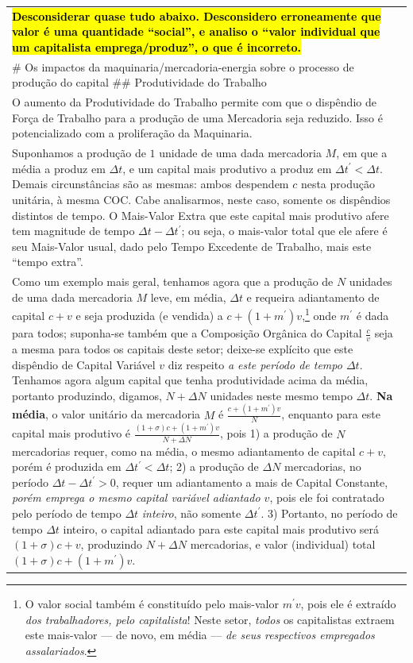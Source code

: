 \documentclass[12pt]{article}
\numberwithin{equation}{section}
\theoremstyle{plain}
\theoremstyle{definition}
\theoremstyle{remark}
\begin{document}
\begin{longtable}[]{@{}
  >{\raggedright\arraybackslash}p{}@{}}
\toprule\noalign{}
\endhead
\bottomrule\noalign{}
\endlastfoot
\hl{\textbf{Desconsiderar quase tudo abaixo. Desconsidero erroneamente que valor é uma quantidade ``social'', e analiso o ``valor individual que um capitalista emprega/produz'', o que é incorreto.}} \\
\# Os impactos da maquinaria/mercadoria-energia sobre o processo de produção do capital \#\# Produtividade do Trabalho \\
O aumento da Produtividade do Trabalho permite com que o dispêndio de Força de Trabalho para a produção de uma Mercadoria seja reduzido. Isso é potencializado com a proliferação da Maquinaria. \\
Suponhamos a produção de $1$ unidade de uma dada mercadoria $M$, em que a média a produz em $\Delta t$, e um capital mais produtivo a produz em $\Delta t^{\prime}<\Delta t$. Demais circunstâncias são as mesmas: ambos despendem $c$ nesta produção unitária, à mesma COC. Cabe analisarmos, neste caso, somente os dispêndios distintos de tempo. O Mais-Valor Extra que este capital mais produtivo afere tem magnitude de tempo $\Delta t-\Delta t^{\prime}$; ou seja, o mais-valor total que ele afere é seu Mais-Valor usual, dado pelo Tempo Excedente de Trabalho, mais este ``tempo extra''. \\
Como um exemplo mais geral, tenhamos agora que a produção de $N$ unidades de uma dada mercadoria $M$ leve, em média, $\Delta t$ e requeira adiantamento de capital $c+v$ e seja produzida (e vendida) a $c+(1+m^{\prime})v$,\footnote{O valor social também é constituído pelo mais-valor $m^{\prime}v$, pois ele é extraído \emph{dos trabalhadores, pelo capitalista}! Neste setor, \emph{todos} os capitalistas extraem este mais-valor --- de novo, em média --- \emph{de seus respectivos empregados assalariados}.} onde $m^\prime$ é dada para todos; suponha-se também que a Composição Orgânica do Capital $\frac{c}{v}$ seja a mesma para todos os capitais deste setor; deixe-se explícito que este dispêndio de Capital Variável $v$ diz respeito \emph{a este período de tempo $\Delta t$}. Tenhamos agora algum capital que tenha produtividade acima da média, portanto produzindo, digamos, $N+\Delta N$ unidades neste mesmo tempo $\Delta t$. \textbf{Na média}, o valor unitário da mercadoria $M$ é $\frac{c+(1+m^{\prime})v}{N}$, enquanto para este capital mais produtivo é $\frac{(1+\sigma)c+(1+m^{\prime})v}{N+\Delta N}$, pois 1) a produção de $N$ mercadorias requer, como na média, o mesmo adiantamento de capital $c+v$, porém é produzida em $\Delta t^{\prime}<\Delta t$; 2) a produção de $\Delta N$ mercadorias, no período $\Delta t-\Delta t^{\prime}>0$, requer um adiantamento a mais de Capital Constante, \emph{porém emprega o mesmo capital variável adiantado $v$}, pois ele foi contratado pelo período de tempo $\Delta t$ \emph{inteiro}, não somente $\Delta t^{\prime}$. 3) Portanto, no período de tempo $\Delta t$ inteiro, o capital adiantado para este capital mais produtivo será $(1+\sigma)c + v$, produzindo $N+\Delta N$ mercadorias, e valor (individual) total $(1+\sigma)c + (1+m^{\prime})v$. \\

\end{longtable}
\end{document}
